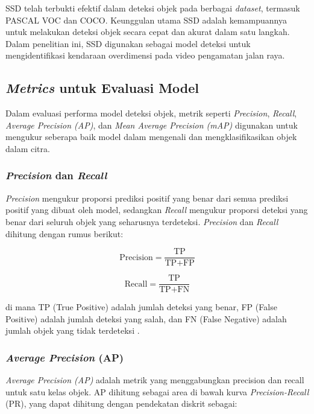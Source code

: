 SSD telah terbukti efektif dalam deteksi objek pada berbagai \emph{dataset}, termasuk PASCAL VOC dan COCO. Keunggulan utama SSD adalah kemampuannya untuk melakukan deteksi objek secara cepat dan akurat dalam satu langkah. Dalam penelitian ini, SSD digunakan sebagai model deteksi untuk mengidentifikasi kendaraan overdimensi pada video pengamatan jalan raya.

\subsection{\emph{Metrics} untuk Evaluasi Model}

Dalam evaluasi performa model deteksi objek, metrik seperti \emph{Precision}, \emph{Recall}, \emph{Average Precision (AP)}, dan \emph{Mean Average Precision (mAP)} digunakan untuk mengukur seberapa baik model dalam mengenali dan mengklasifikasikan objek dalam citra.

\subsubsection{\emph{Precision} dan \emph{Recall}}

\emph{Precision} mengukur proporsi prediksi positif yang benar dari semua prediksi positif yang dibuat oleh model, sedangkan \emph{Recall} mengukur proporsi deteksi yang benar dari seluruh objek yang seharusnya terdeteksi. \emph{Precision} dan \emph{Recall} dihitung dengan rumus berikut:

\begin{equation}
\mbox{Precision} = \frac{\mbox{TP}}{\mbox{TP} + \mbox{FP}}
\label{eq:precision}
\end{equation}

\begin{equation}
\mbox{Recall} = \frac{\mbox{TP}}{\mbox{TP} + \mbox{FN}}
\label{eq:recall}
\end{equation}

di mana TP (True Positive) adalah jumlah deteksi yang benar, FP (False Positive) adalah jumlah deteksi yang salah, dan FN (False Negative) adalah jumlah objek yang tidak terdeteksi \parencite*{padilla2020survey}.

\subsubsection{\emph{Average Precision} (AP)}

\emph{Average Precision (AP)} adalah metrik yang menggabungkan precision dan recall untuk satu kelas objek. AP dihitung sebagai area di bawah kurva \emph{Precision-Recall} (PR), yang dapat dihitung dengan pendekatan diskrit sebagai:

